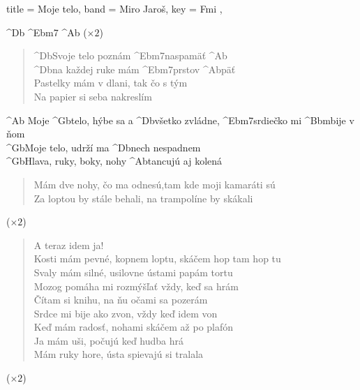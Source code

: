 \begin{song}[
    remember-chords = true ,
    verse/numbered = true ,
    transpose-capo = true 
  ]{
    title = Moje telo,
    band = Miro Jaroš,
    key  = Fmi ,
  }
  
	\begin{intro}
	^{Db} ^{Ebm7} ^{Ab} ($\times2$)
	\end{intro}  
  
	\begin{verse}
	^{Db}Svoje telo poznám ^{Ebm7}naspamäť ^{Ab} \\
	^{Db}na každej ruke mám ^{Ebm7}prstov ^{Ab}päť \\
	Pastelky mám v dlani, tak čo s tým \\
	Na papier si seba nakreslím
	\end{verse}
	
	\begin{chorus}
	^{Ab} Moje ^{Gb}telo, hýbe sa a ^{Db}všetko zvládne, ^{Ebm7}srdiečko mi ^{Bbm}bije v ňom \\
	^{Gb}Moje telo, udrží ma ^{Db}nech nespadnem \\
	^{Gb}Hlava, ruky, boky, nohy ^{Ab}tancujú aj kolená
	\end{chorus}
	
	\begin{chorus}
	\end{chorus}
	
	\begin{verse}
	Mám dve nohy, čo ma odnesú,tam kde moji kamaráti sú \\
	Za loptou by stále behali, na trampolíne by skákali
	\end{verse}
	
	\begin{chorus}
	($\times2$)
	\end{chorus}
	
	\begin{verse}
	A teraz idem ja! \\
	Kosti mám pevné, kopnem loptu, skáčem hop tam hop tu \\
	Svaly mám silné, usilovne ústami papám tortu \\
	Mozog pomáha mi rozmýšľať vždy, keď sa hrám \\
	Čítam si knihu, na ňu očami sa pozerám \\
	Srdce mi bije ako zvon, vždy keď idem von \\
	Keď mám radosť, nohami skáčem až po plafón \\
	Ja mám uši, počujú keď hudba hrá \\
	Mám ruky hore, ústa spievajú si tralala
	\end{verse}
	
	\begin{chorus}
	($\times2$)
	\end{chorus}
	
\end{song}